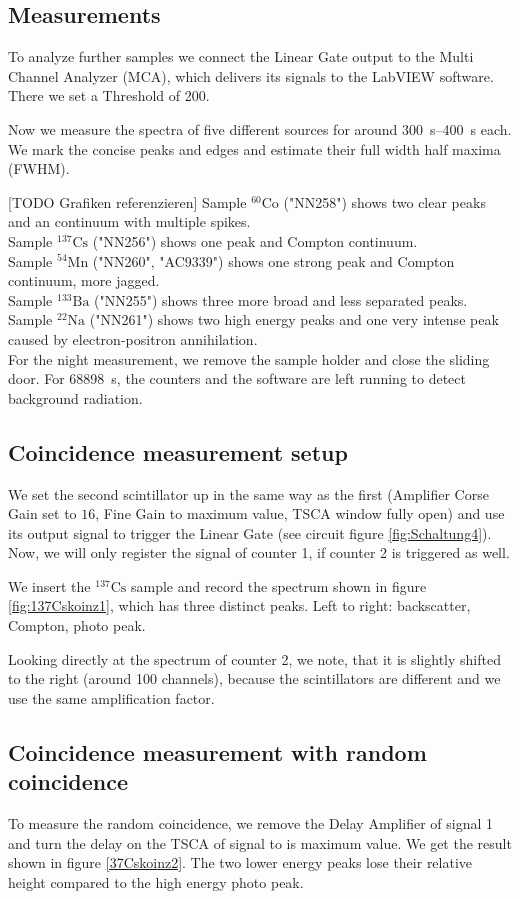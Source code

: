\subsection{Measurements}
%
To analyze further samples we connect the Linear Gate output to the Multi Channel Analyzer (MCA), which delivers its signals to the LabVIEW software.
There we set a Threshold of 200.
%
\par
%
Now we measure the spectra of five different sources for around \SIrange{300}{400}{\second} each.
We mark the concise peaks and edges and estimate their full width half maxima (FWHM).
%
\par
%
[TODO Grafiken referenzieren]
Sample $^{60}\text{Co}$ ("NN258") shows two clear peaks and an continuum with multiple spikes. \\
Sample $^{137}\text{Cs}$ ("NN256") shows one peak and Compton continuum. \\
Sample $^{54}\text{Mn}$ ("NN260", "AC9339") shows one strong peak and Compton continuum, more jagged. \\
Sample $^{133}\text{Ba}$ ("NN255") shows three more broad and less separated peaks. \\
Sample $^{22}\text{Na}$ ("NN261") shows two high energy peaks and one very intense peak caused by electron-positron annihilation. \\
For the night measurement, we remove the sample holder and close the sliding door.
For \SI{68898}{\second}, the counters and the software are left running to detect background radiation.
%
\subsection{Coincidence measurement setup}
%
We set the second scintillator up in the same way as the first (Amplifier Corse Gain set to $16$, Fine Gain to maximum value, TSCA window fully open) and use its output signal to trigger the Linear Gate (see circuit figure \ref{fig:Schaltung4}).
Now, we will only register the signal of counter 1, if counter 2 is triggered as well.
%
\par
%
We insert the $^{137}\text{Cs}$ sample and record the spectrum shown in figure \ref{fig:137Cskoinz1}, which has three distinct peaks.
Left to right: backscatter, Compton, photo peak.
%
\par
%
Looking directly at the spectrum of counter 2, we note, that it is slightly shifted to the right (around 100 channels), because the scintillators are different and we use the same amplification factor.
%
\subsection{Coincidence measurement with random coincidence}
%
To measure the random coincidence, we remove the Delay Amplifier of signal 1 and turn the delay on the TSCA of signal to is maximum value.
We get the result shown in figure \ref{37Cskoinz2}.
The two lower energy peaks lose their relative height compared to the high energy photo peak.
%
